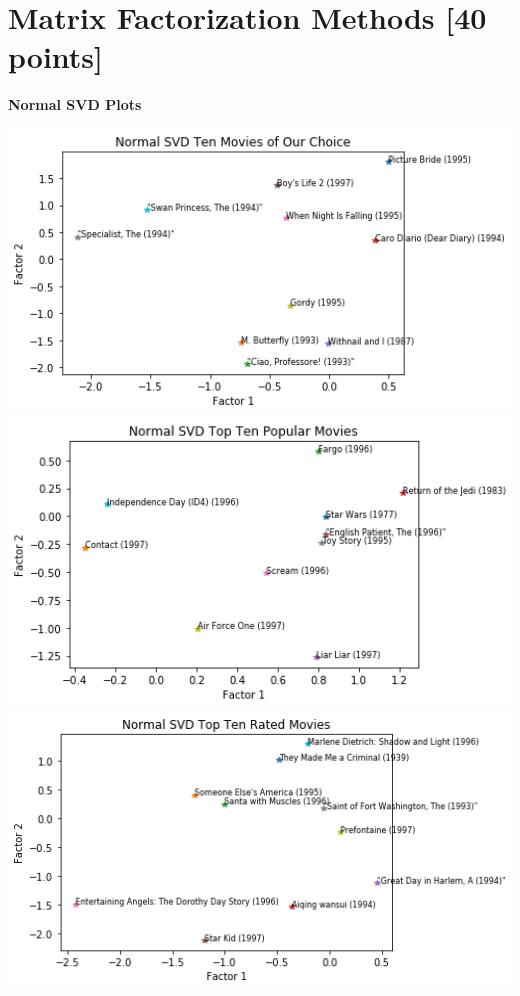 \section{Matrix Factorization Methods [40 points]}
\medskip
\noindent\textbf{Normal SVD Plots }\\
\begin{center}
	\includegraphics[width=16cm]{Pictures/Normal_choice}
	\includegraphics[width=16cm]{Pictures/Normal_popular}
	\includegraphics[width=16cm]{Pictures/Normal_highest}

\end{center}
